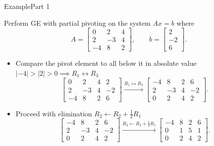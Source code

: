 \documentclass[10pt]{beamer}
\begin{document}
\begin{frame}{Example}{Part 1}

\begin{example}
    Perform GE with partial pivoting on the system $Ax=b$ where 
\[
A=
\begin{bmatrix}
    0&2&4\\
    2&-3&4\\
    -4&8&2
\end{bmatrix},
\qquad
b=
\begin{bmatrix}
    2\\-2\\6
\end{bmatrix}.
\]
\end{example}

\begin{itemize}
    \item Compare the pivot element to all below it in absolute value $|-4|>|2|>0 \implies R_1 \leftrightarrow R_3$
    \[
    \left[
    \begin{array}{rrr|r}
        \boxed{0}&2&4&2\\
        2&-3&4&-2\\
        -4&8&2&6
    \end{array}
    \right]
    \xrightarrow{R_1\leftrightarrow R_3}
    \left[
    \begin{array}{rrr|r}
        \boxed{-4}&8&2&6\\
        2&-3&4&-2\\
        0&2&4&2
    \end{array}
    \right].
    \]
    \item Proceed with elimination $R_2 \leftarrow R_2 +\frac{1}{2}R_1$
\[
\left[
\begin{array}{rrr|r}
    \boxed{-4}&8&2&6\\
    2&-3&4&-2\\
    0&2&4&2
\end{array}
\right]
\xrightarrow{R_2\leftarrow R_2+\frac12R_1}
\left[
\begin{array}{rrr|r}
    \boxed{-4}&8&2&6\\
    0&1&5&1\\
    0&2&4&2
\end{array}
\right].
\]
    
\end{itemize}
\end{frame}
\end{document}
